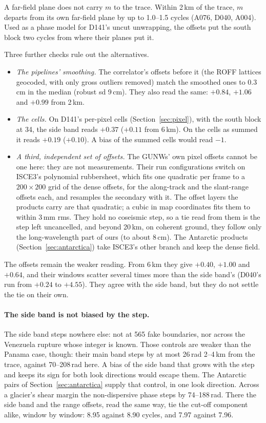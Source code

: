 A far-field plane does not carry $m$ to the trace. Within 2\,km of the trace, $m$ departs from its own far-field plane
by up to 1.0--1.5 cycles (A076, D040, A004). Used as a phase model for D141's uncut unwrapping, the offsets put the south
block two cycles from where their planes put it.

Three further checks rule out the alternatives.
\begin{itemize}
  \item \emph{The pipelines' smoothing.} The correlator's offsets before it (the ROFF lattices geocoded, with only gross
        outliers removed) match the smoothed ones to 0.3\,cm in the median (robust sd 9\,cm). They also read the same:
        $+0.84$, $+1.06$ and $+0.99$ from 2\,km.
  \item \emph{The cells.} On D141's per-pixel cells (Section~\ref{sec:pixel}), with the south block at 34, the side band
        reads $+0.37$ ($+0.11$ from 6\,km). On the cells as summed it reads $+0.19$ ($+0.10$). A bias of the summed
        cells would read $-1$.
  \item \emph{A third, independent set of offsets.} The GUNWs' own pixel offsets cannot be one here: they are not
        measurements. Their run configurations switch on ISCE3's polynomial rubbersheet, which fits one quadratic per
        frame to a $200\times200$ grid of the dense offsets, for the along-track and the slant-range offsets each, and
        resamples the secondary with it. The offset layers the products carry are that quadratic; a cubic in map
        coordinates fits them to within 3\,mm rms. They hold no coseismic step, so a tie read from them is the step left
        uncancelled, and beyond 20\,km, on coherent ground, they follow only the long-wavelength part of ours (to about
        8\,cm). The Antarctic products (Section~\ref{sec:antarctica}) take ISCE3's other branch and keep the dense
        field.
\end{itemize}
The offsets remain the weaker reading. From 6\,km they give $+0.40$, $+1.00$ and $+0.64$, and their windows scatter
several times more than the side band's (D040's run from $+0.24$ to $+4.55$). They agree with the side band, but they do
not settle the tie on their own.

\paragraph{The side band is not biased by the step.} The side band steps nowhere else: not at 565 fake boundaries, nor
across the Venezuela rupture whose integer is known. Those controls are weaker than the Panama case, though: their main
band steps by at most 26\,rad 2--4\,km from the trace, against 70--208\,rad here. A bias of the side band that grows with
the step and keeps its sign for both look directions would escape them. The Antarctic pairs of
Section~\ref{sec:antarctica} supply that control, in one look direction. Across a glacier's shear margin the
non-dispersive phase steps by 74--188\,rad. There the side band and the range offsets, read the same way, tie the cut-off
component alike, window by window: 8.95 against 8.90 cycles, and 7.97 against 7.96.


